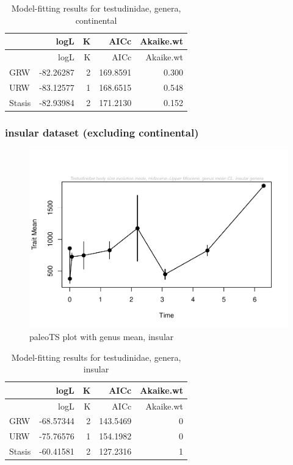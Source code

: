 \begin{longtable}[]{@{}lrrrr@{}}
	\caption{Model-fitting results for testudinidae, genera,
		continental}
	\label{tab:pTSCEM}\tabularnewline
	\toprule
	& logL & K & AICc & Akaike.wt\tabularnewline
	\midrule
	\endfirsthead
	\toprule
	& logL & K & AICc & Akaike.wt\tabularnewline
	\midrule
	\endhead
	GRW & -82.26287 & 2 & 169.8591 & 0.300\tabularnewline
	URW & -83.12577 & 1 & 168.6515 & 0.548\tabularnewline
	Stasis & -82.93984 & 2 & 171.2130 & 0.152\tabularnewline
	\bottomrule
\end{longtable}


\FloatBarrier

\subsubsection{insular dataset (excluding
	continental)}\label{insular-excluding-continental}




\begin{figure}[H]
	\centering
	\includegraphics{MA_JJ_files/figure-latex/paleoTSI-1.pdf}
	\caption{paleoTS plot with genus mean, insular}
	\label{fig:pTSI}
\end{figure}

\begin{longtable}[]{@{}lrrrr@{}}
	\caption{Model-fitting results for testudinidae, genera,
		insular}
	\label{tab:pTSIEM}\tabularnewline
	\toprule
	& logL & K & AICc & Akaike.wt\tabularnewline
	\midrule
	\endfirsthead
	\toprule
	& logL & K & AICc & Akaike.wt\tabularnewline
	\midrule
	\endhead
	GRW & -68.57344 & 2 & 143.5469 & 0\tabularnewline
	URW & -75.76576 & 1 & 154.1982 & 0\tabularnewline
	Stasis & -60.41581 & 2 & 127.2316 & 1\tabularnewline
	\bottomrule
\end{longtable}

